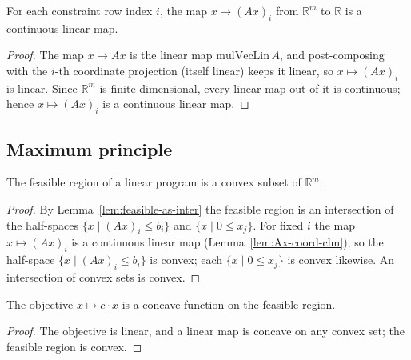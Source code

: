 \begin{lemma}
    \label{lem:Ax-coord-clm}
    \leanok
    For each constraint row index $i$, the map $x \mapsto (A x)_i$ from
    $\mathbb{R}^m$ to $\mathbb{R}$ is a continuous linear map.
\end{lemma}
\begin{proof}
    The map $x \mapsto A x$ is the linear map $\mathrm{mulVecLin}\,A$, and
    post-composing with the $i$-th coordinate projection (itself linear) keeps it
    linear, so $x \mapsto (A x)_i$ is linear. Since $\mathbb{R}^m$ is
    finite-dimensional, every linear map out of it is continuous; hence
    $x \mapsto (A x)_i$ is a continuous linear map.
\end{proof}

\subsection{Maximum principle}

\begin{lemma}
    \label{lem:feasible-convex}
    \leanok
    The feasible region of a linear program is a convex subset of $\mathbb{R}^m$.
\end{lemma}
\begin{proof}
    By Lemma~\ref{lem:feasible-as-inter} the feasible region is an intersection
    of the half-spaces $\{x \mid (A x)_i \le b_i\}$ and $\{x \mid 0 \le x_j\}$.
    For fixed $i$ the map $x \mapsto (A x)_i$ is a continuous linear map
    (Lemma~\ref{lem:Ax-coord-clm}), so the half-space $\{x \mid (A x)_i \le b_i\}$
    is convex; each $\{x \mid 0 \le x_j\}$ is convex likewise. An intersection of
    convex sets is convex.
\end{proof}

\begin{lemma}
    \label{lem:objective-concave}
    \leanok
    The objective $x \mapsto c \cdot x$ is a concave function on the feasible
    region.
\end{lemma}
\begin{proof}
    The objective is linear, and a linear map is concave on any convex set;
    the feasible region is convex.
\end{proof}

